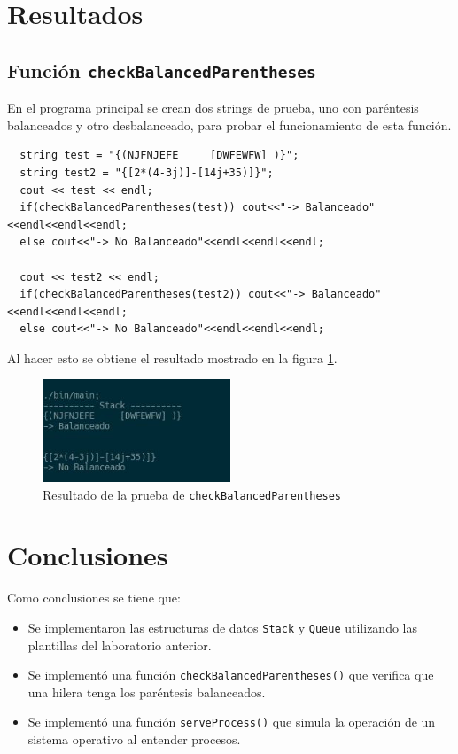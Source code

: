 \section{Resultados}

\subsection{Función \texttt{checkBalancedParentheses}}
En el programa principal se crean dos strings de prueba, uno con paréntesis balanceados y otro desbalanceado, para probar el funcionamiento de esta función.

\begin{verbatim}
  string test = "{(NJFNJEFE     [DWFEWFW] )}";
  string test2 = "{[2*(4-3j)]-[14j+35)]}";
  cout << test << endl;
  if(checkBalancedParentheses(test)) cout<<"-> Balanceado"<<endl<<endl<<endl;
  else cout<<"-> No Balanceado"<<endl<<endl<<endl;
  
  cout << test2 << endl;
  if(checkBalancedParentheses(test2)) cout<<"-> Balanceado"<<endl<<endl<<endl;
  else cout<<"-> No Balanceado"<<endl<<endl<<endl;
\end{verbatim}

Al hacer esto se obtiene el resultado mostrado en la figura \ref{fig:res_check}.

\begin{figure}[H]
\centering
\includegraphics[width=0.5\textwidth]{imgs/Labo8/res_check}
\caption{Resultado de la prueba de \texttt{checkBalancedParentheses}}
\label{fig:res_check}
\end{figure}

\section{Conclusiones}


Como conclusiones se tiene que:

\begin{itemize}
\item Se implementaron las estructuras de datos \texttt{Stack} y \texttt{Queue} utilizando las plantillas del laboratorio anterior.
\item Se implementó una función \texttt{checkBalancedParentheses()} que verifica que una hilera tenga los paréntesis balanceados.
\item Se implementó una función \texttt{serveProcess()} que simula la operación de un sistema operativo al entender procesos.
\end{itemize}



